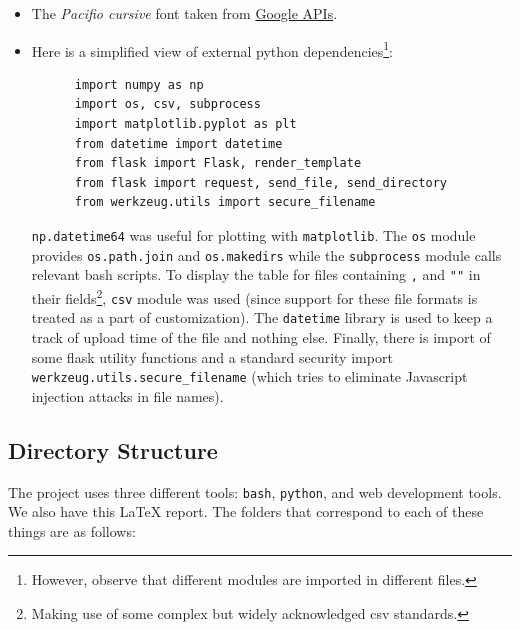 \documentclass[11pt]{scrartcl}
\begin{document}
\begin{itemize}
  \item The \textit{Pacifio cursive} font taken from
    \href{https://fonts.googleapis.com/css2?family=Pacifico&display=swap}{Google APIs}.

  \item Here is a simplified view of external python
    dependencies\footnote{However, observe that different modules are imported
    in different files.}:
    \begin{verbatim}
      import numpy as np
      import os, csv, subprocess
      import matplotlib.pyplot as plt
      from datetime import datetime
      from flask import Flask, render_template
      from flask import request, send_file, send_directory
      from werkzeug.utils import secure_filename
    \end{verbatim}

    \texttt{np.datetime64} was useful for plotting with \texttt{matplotlib}.  The
    \texttt{os} module provides \texttt{os.path.join} and \texttt{os.makedirs}
    while the \texttt{subprocess} module calls relevant bash scripts. To
    display the table for files containing \texttt{,} and \texttt{""} in their
    fields\footnote{Making use of some complex but widely acknowledged csv
    standards.}, \texttt{csv} module was used (since support for these file
    formats is treated as a part of customization). The \texttt{datetime}
    library is used to keep a track of upload time of the file and nothing else.
    Finally, there is import of some flask utility functions and a standard
    security import \texttt{werkzeug.utils.secure\_filename} (which
    tries to eliminate Javascript injection attacks in file names).

\end{itemize}

\subsection{Directory Structure}
The project uses three different tools: \texttt{bash}, \texttt{python}, and web
development tools. We also have this {\LaTeX} report. The folders that
correspond to each of these things are as follows:
\end{document}
